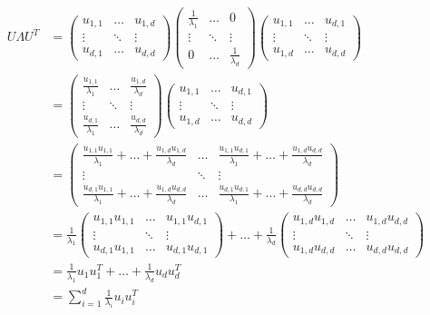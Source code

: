 \documentclass[11pt]{article}
\begin{document}
\begin{align}
	U\Lambda U^{T} &= 
		\begin{pmatrix}
		u_{1,1} & \dots & u_{1,d} \\
		\vdots & \ddots & \vdots \\
		u_{d,1} & \dots & u_{d,d}
		\end{pmatrix}
		\begin{pmatrix}
		\frac{1}{\lambda_1} & \dots & 0 \\
		\vdots & \ddots & \vdots \\
		0 & \dots & \frac{1}{\lambda_d}
		\end{pmatrix}
		\begin{pmatrix}
		u_{1,1} & \dots & u_{d,1} \\
		\vdots & \ddots & \vdots \\
		u_{1,d} & \dots & u_{d,d}
		\end{pmatrix} 
		\\
		&= 
		\begin{pmatrix}
		\frac{u_{1,1}}{\lambda_1} & \dots & \frac{u_{1,d}}{\lambda_d} \\
		\vdots & \ddots & \vdots \\
		\frac{u_{d,1}}{\lambda_1} & \dots & \frac{u_{d,d}}{\lambda_d}
		\end{pmatrix}
		\begin{pmatrix}
		u_{1,1} & \dots & u_{d,1} \\
		\vdots & \ddots & \vdots \\
		u_{1,d} & \dots & u_{d,d}
		\end{pmatrix}
		\\
		&=
		\begin{pmatrix}
		\frac{u_{1,1}u_{1,1}}{\lambda_1}+\dots+\frac{u_{1,d}u_{1,d}}{\lambda_d} & \dots & \frac{u_{1,1}u_{d,1}}{\lambda_1} + \dots + \frac{u_{1,d}u_{d,d}}{\lambda_d} \\
		\vdots & \ddots & \vdots \\
		\frac{u_{d,1}u_{1,1}}{\lambda_1} + \dots + \frac{u_{1,d}u_{d,d}}{\lambda_d} & \dots & \frac{u_{d,1}u_{d,1}}{\lambda_1} + \dots + \frac{u_{d,d}u_{d,d}}{\lambda_d}
		\end{pmatrix}
		\\
		&=
		\frac{1}{\lambda_1}
		\begin{pmatrix}
		u_{1,1}u_{1,1} & \dots & u_{1,1}u_{d,1} \\
		\vdots & \ddots & \vdots \\
		u_{d,1}u_{1,1} & \dots & u_{d,1}u_{d,1}
		\end{pmatrix}
		+ \dots +
		\frac{1}{\lambda_d}
		\begin{pmatrix}
		u_{1,d}u_{1,d} & \dots & u_{1,d}u_{d,d} \\
		\vdots & \ddots & \vdots \\
		u_{1,d}u_{d,d} & \dots & u_{d,d}u_{d,d}
		\end{pmatrix}
		\\
		&=
		\frac{1}{\lambda_1}u_1u_1^{T} + \dots + \frac{1}{\lambda_d}u_du_d^{T} \\
		&= \sum_{i=1}^{d} \frac{1}{\lambda_i}u_iu_i^T
\end{align}
\end{document}
